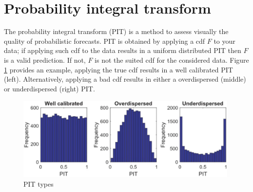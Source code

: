 \section{Probability integral transform}
The probability integral transform (PIT) is a method to assess visually the quality of probabilistic forecasts. PIT is obtained by applying a cdf $F$ to your data; if applying such cdf to the data results in a uniform distributed PIT then $F$ is a valid prediction. If not, $F$ is not the suited cdf for the considered data. Figure \ref{fig:pit} provides an example, applying the true cdf results in a well calibrated PIT (left). Alternatively, applying a bad cdf results in either a overdispersed (middle) or underdispersed (right) PIT.
\begin{figure}
    \includegraphics[width=\textwidth]{images/pit.png}
    \caption{PIT types \cite{haben2023core}}
    \label{fig:pit}
  \end{figure}
\\

